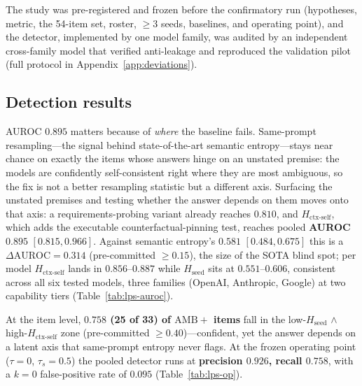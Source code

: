\documentclass[acmsmall,screen,review,anonymous]{acmart}
\newcommand{\Hseed}{\ensuremath{H_{\mathrm{seed}}}}
\newcommand{\Hctx}{\ensuremath{H_{\text{ctx-self}}}}
\begin{document}
The study was pre-registered and frozen before the confirmatory run (hypotheses, metric, the 54-item set,
roster, $\ge 3$ seeds, baselines, and operating point), and the detector, implemented by one model family,
was audited by an independent cross-family model that verified anti-leakage and reproduced the validation
pilot (full protocol in Appendix~\ref{app:deviations}).

\subsection{Detection results}
\label{sec:study2-results}
AUROC $0.895$ matters because of \emph{where} the baseline fails. Same-prompt resampling---the signal
behind state-of-the-art semantic entropy---stays near chance on exactly the items whose answers hinge on an
unstated premise: the models are confidently self-consistent right where they are most ambiguous, so the
fix is not a better resampling statistic but a different axis. Surfacing the unstated premises and testing
whether the answer depends on them moves onto that axis: a requirements-probing variant already reaches
$0.810$, and \Hctx{}, which adds the executable counterfactual-pinning test, reaches pooled
\textbf{AUROC $0.895$} $[0.815, 0.966]$. Against semantic entropy's \textbf{$0.581$} $[0.484, 0.675]$ this is
a $\Delta\mathrm{AUROC} = 0.314$ (pre-committed $\ge 0.15$), the size of the SOTA blind spot; per model
\Hctx{} lands in $0.856$--$0.887$ while \Hseed{} sits at $0.551$--$0.606$, consistent across all six tested
models, three families (OpenAI, Anthropic, Google) at two capability tiers (Table~\ref{tab:lps-auroc}).

At the item level, \textbf{$0.758$ (25 of 33) of $\mathrm{AMB}{+}$
items} fall in the low-\Hseed{} $\wedge$ high-\Hctx{} zone (pre-committed $\ge 0.40$)---confident, yet the
answer depends on a latent axis that same-prompt entropy never flags. At the frozen operating point
($\tau=0$, $\tau_s=0.5$) the pooled detector runs at \textbf{precision $0.926$, recall $0.758$}, with a
$k{=}0$ false-positive rate of $0.095$ (Table~\ref{tab:lps-op}).
\end{document}
